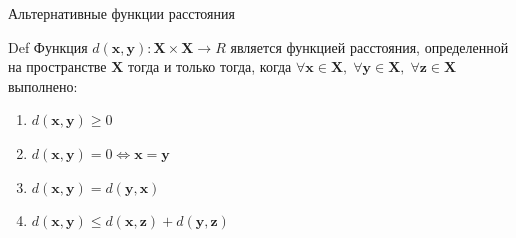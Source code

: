 \documentclass[10pt]{beamer}
\begin{document}
\begin{frame}{Альтернативные функции расстояния}

\begin{exampleblock}{Def}
Функция $d(\mathbf{x}, \mathbf{y}): \mathbf{X} \times \mathbf{X} \rightarrow R$ является функцией расстояния, определенной на пространстве $\mathbf{X}$ тогда и только тогда, когда $\forall \mathbf{x} \in \mathbf{X}, \; \forall \mathbf{y} \in \mathbf{X}, \; \forall \mathbf{z} \in \mathbf{X}$ выполнено:
\begin{enumerate}
\item $d(\mathbf{x}, \mathbf{y}) \geq 0$
\item $d(\mathbf{x}, \mathbf{y}) = 0 \Leftrightarrow \mathbf{x} = \mathbf{y}$
\item $d(\mathbf{x}, \mathbf{y}) = d(\mathbf{y}, \mathbf{x})$
\item $d(\mathbf{x}, \mathbf{y}) \leq d(\mathbf{x}, \mathbf{z}) + d(\mathbf{y}, \mathbf{z})$
\end{enumerate}
\end{exampleblock}

\end{frame}
\end{document}

